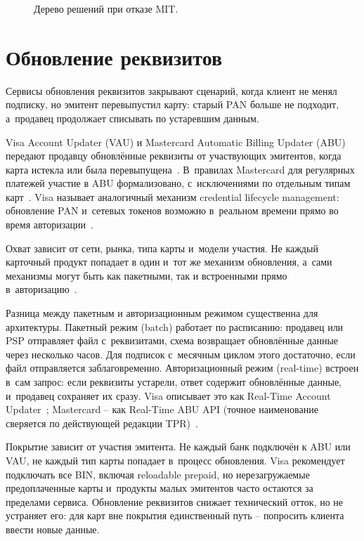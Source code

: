 \begin{figure}[tbp]
  \centering
  \caption{Дерево решений при отказе MIT.}\label{fig:decline-decision-tree}
\end{figure}

\section{Обновление реквизитов}\label{sec:subscriptions-account-updater}

Сервисы обновления реквизитов закрывают сценарий, когда клиент не
менял подписку, но эмитент перевыпустил карту: старый PAN больше
не подходит, а~продавец продолжает списывать по устаревшим данным.

Visa Account Updater (VAU) и Mastercard Automatic Billing Updater
(ABU) передают продавцу обновлённые реквизиты от участвующих
эмитентов, когда карта истекла или была
перевыпущена~\cite{mc-abu-privacy}. В~правилах Mastercard для
регулярных платежей участие в ABU формализовано, с~исключениями
по отдельным типам карт~\cite{mc-tpr}. Visa называет аналогичный
механизм credential lifecycle management: обновление PAN и~сетевых
токенов возможно в~реальном времени прямо во время
авторизации~\cite{visa-lifecycle-management}.

Охват зависит от сети, рынка,
типа карты и~модели участия. Не каждый карточный продукт попадает в
один и~тот же механизм обновления, а~сами механизмы могут быть как
пакетными, так и встроенными прямо в~авторизацию~\cite{mc-tpr,visa-lifecycle-management}.

Разница между пакетным и авторизационным режимом существенна
для архитектуры. Пакетный режим (batch) работает по расписанию:
продавец или PSP отправляет файл с~реквизитами, схема возвращает
обновлённые данные через несколько часов. Для подписок с~месячным
циклом этого достаточно, если файл отправляется заблаговременно.
Авторизационный режим (real-time) встроен в~сам запрос: если
реквизиты устарели, ответ содержит обновлённые данные, и~продавец
сохраняет их сразу. Visa описывает это как Real-Time Account
Updater~\cite{visa-lifecycle-management}; Mastercard --
как Real-Time ABU API (точное наименование сверяется
по действующей редакции TPR)~\cite{mc-tpr}.

Покрытие зависит от участия эмитента. Не каждый банк подключён
к ABU или VAU, не каждый тип карты попадает в~процесс обновления.
Visa рекомендует подключать все BIN, включая reloadable prepaid,
но нерезагружаемые предоплаченные карты и~продукты малых эмитентов часто
остаются за пределами сервиса. Обновление реквизитов снижает
технический отток, но не устраняет его: для карт вне покрытия
единственный путь -- попросить клиента ввести новые данные.

